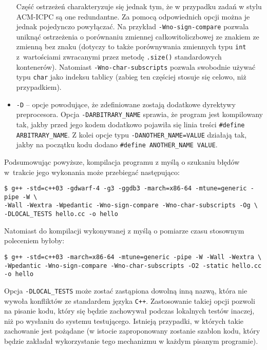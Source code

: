 \begin{itemize}
Część ostrzeżeń charakteryzuje się jednak tym, że w przypadku zadań w stylu
ACM-ICPC są one redundantne. Za pomocą odpowiednich opcji można je jednak
pojedynczo powyłączać. Na przykład \texttt{-Wno-sign-compare} pozwala uniknąć
ostrzeżenia o porównaniu zmiennej całkowitoliczbowej ze znakiem ze zmienną bez
znaku (dotyczy to także porównywania zmiennych typu \texttt{int} z~wartościami
zwracanymi przez metodę \texttt{.size()} standardowych kontenerów).
Natomiast \texttt{-Wno-char-subscripts} pozwala swobodnie używać typu
\texttt{char} jako indeksu tablicy (zabieg ten częściej stosuje się celowo, niż
przypadkiem).

\item \texttt{-D} -- opcje powodujące, że zdefiniowane zostają dodatkowe
dyrektywy preprocesora. Opcja \texttt{-DARBITRARY\_NAME} sprawia, że program
jest kompilowany tak, jakby przed jego kodem dodatkowo pojawiła się linia treści
\texttt{\#define ARBITRARY\_NAME}. Z kolei opcje typu
\texttt{-DANOTHER\_NAME=VALUE} działają tak, jakby na początku kodu dodano
\texttt{\#define ANOTHER\_NAME VALUE}.
\end{itemize}

Podsumowując powyższe, kompilacja programu z myślą o szukaniu błędów w~trakcie
jego wykonania może przebiegać następująco:
\begin{Verbatim}[fontsize=\footnotesize]
$ g++ -std=c++03 -gdwarf-4 -g3 -ggdb3 -march=x86-64 -mtune=generic -pipe -W \
-Wall -Wextra -Wpedantic -Wno-sign-compare -Wno-char-subscripts -Og \
-DLOCAL_TESTS hello.cc -o hello
\end{Verbatim}

Natomiast do kompilacji wykonywanej z myślą o pomiarze czasu stosownym
poleceniem byłoby:
\begin{Verbatim}[fontsize=\footnotesize]
$ g++ -std=c++03 -march=x86-64 -mtune=generic -pipe -W -Wall -Wextra \
-Wpedantic -Wno-sign-compare -Wno-char-subscripts -O2 -static hello.cc -o hello
\end{Verbatim}

Opcja \texttt{-DLOCAL\_TESTS} może zostać zastąpiona dowolną inną nazwą, która
nie wywoła konfliktów ze standardem języka \texttt{C++}. Zastosowanie takiej
opcji pozwoli na pisanie kodu, który się będzie zachowywał podczas lokalnych
testów inaczej, niż po wysłaniu do systemu testującego. Istnieją przypadki,
w których takie zachowanie jest pożądane (w istocie zaproponowany zostanie
szablon kodu, który będzie zakładał wykorzystanie tego mechanizmu w każdym
pisanym programie).

